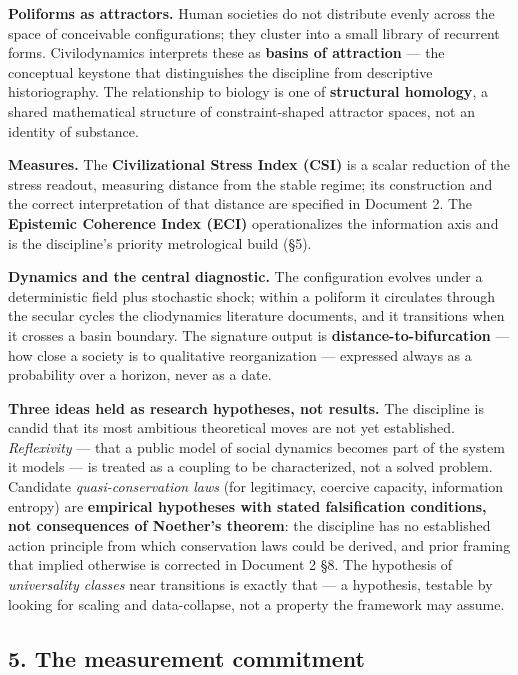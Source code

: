 \documentclass[
]{article}
\begin{document}
\textbf{Poliforms as attractors.} Human societies do not distribute
evenly across the space of conceivable configurations; they cluster into
a small library of recurrent forms. Civilodynamics interprets these as
\textbf{basins of attraction} --- the conceptual keystone that
distinguishes the discipline from descriptive historiography. The
relationship to biology is one of \textbf{structural homology}, a shared
mathematical structure of constraint-shaped attractor spaces, not an
identity of substance.

\textbf{Measures.} The \textbf{Civilizational Stress Index (CSI)} is a
scalar reduction of the stress readout, measuring distance from the
stable regime; its construction and the correct interpretation of that
distance are specified in Document 2. The \textbf{Epistemic Coherence
Index (ECI)} operationalizes the information axis and is the
discipline's priority metrological build (§5).

\textbf{Dynamics and the central diagnostic.} The configuration evolves
under a deterministic field plus stochastic shock; within a poliform it
circulates through the secular cycles the cliodynamics literature
documents, and it transitions when it crosses a basin boundary. The
signature output is \textbf{distance-to-bifurcation} --- how close a
society is to qualitative reorganization --- expressed always as a
probability over a horizon, never as a date.

\textbf{Three ideas held as research hypotheses, not results.} The
discipline is candid that its most ambitious theoretical moves are not
yet established. \emph{Reflexivity} --- that a public model of social
dynamics becomes part of the system it models --- is treated as a
coupling to be characterized, not a solved problem. Candidate
\emph{quasi-conservation laws} (for legitimacy, coercive capacity,
information entropy) are \textbf{empirical hypotheses with stated
falsification conditions, not consequences of Noether's theorem}: the
discipline has no established action principle from which conservation
laws could be derived, and prior framing that implied otherwise is
corrected in Document 2 §8. The hypothesis of \emph{universality
classes} near transitions is exactly that --- a hypothesis, testable by
looking for scaling and data-collapse, not a property the framework may
assume.

\subsection{5. The measurement
commitment}\label{the-measurement-commitment}
\end{document}
